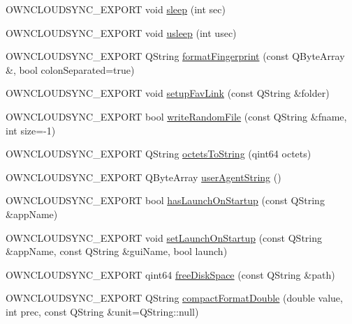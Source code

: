 \begin{DoxyCompactItemize}
\item 
O\+W\+N\+C\+L\+O\+U\+D\+S\+Y\+N\+C\+\_\+\+E\+X\+P\+O\+RT void \hyperlink{namespace_o_c_c_1_1_utility_a2a5852559fec33206166584c0bdc0827}{sleep} (int sec)
\item 
O\+W\+N\+C\+L\+O\+U\+D\+S\+Y\+N\+C\+\_\+\+E\+X\+P\+O\+RT void \hyperlink{namespace_o_c_c_1_1_utility_ac9cc640e21cdc30773dcdf9eaa01904d}{usleep} (int usec)
\item 
O\+W\+N\+C\+L\+O\+U\+D\+S\+Y\+N\+C\+\_\+\+E\+X\+P\+O\+RT Q\+String \hyperlink{namespace_o_c_c_1_1_utility_a2a3ee3aad7e4c551758f0bceb7c76172}{format\+Fingerprint} (const Q\+Byte\+Array \&, bool colon\+Separated=true)
\item 
O\+W\+N\+C\+L\+O\+U\+D\+S\+Y\+N\+C\+\_\+\+E\+X\+P\+O\+RT void \hyperlink{namespace_o_c_c_1_1_utility_adaea063f9fc0245cd9611c76a0ef38e6}{setup\+Fav\+Link} (const Q\+String \&folder)
\item 
O\+W\+N\+C\+L\+O\+U\+D\+S\+Y\+N\+C\+\_\+\+E\+X\+P\+O\+RT bool \hyperlink{namespace_o_c_c_1_1_utility_a7f843bb280e0e8485149094c9ffbee48}{write\+Random\+File} (const Q\+String \&fname, int size=-\/1)
\item 
O\+W\+N\+C\+L\+O\+U\+D\+S\+Y\+N\+C\+\_\+\+E\+X\+P\+O\+RT Q\+String \hyperlink{namespace_o_c_c_1_1_utility_a9b789ccc2cc363c3adcbd7cde466375c}{octets\+To\+String} (qint64 octets)
\item 
O\+W\+N\+C\+L\+O\+U\+D\+S\+Y\+N\+C\+\_\+\+E\+X\+P\+O\+RT Q\+Byte\+Array \hyperlink{namespace_o_c_c_1_1_utility_a4beaff7073bfbd75da5f761b8c02c1ab}{user\+Agent\+String} ()
\item 
O\+W\+N\+C\+L\+O\+U\+D\+S\+Y\+N\+C\+\_\+\+E\+X\+P\+O\+RT bool \hyperlink{namespace_o_c_c_1_1_utility_a4db4f042cee5710dad04f70193992740}{has\+Launch\+On\+Startup} (const Q\+String \&app\+Name)
\item 
O\+W\+N\+C\+L\+O\+U\+D\+S\+Y\+N\+C\+\_\+\+E\+X\+P\+O\+RT void \hyperlink{namespace_o_c_c_1_1_utility_a65ed1f8867bc2161160f62bf07b5fed0}{set\+Launch\+On\+Startup} (const Q\+String \&app\+Name, const Q\+String \&gui\+Name, bool launch)
\item 
O\+W\+N\+C\+L\+O\+U\+D\+S\+Y\+N\+C\+\_\+\+E\+X\+P\+O\+RT qint64 \hyperlink{namespace_o_c_c_1_1_utility_a0b8741e91bdc3b0209d75c3627308b89}{free\+Disk\+Space} (const Q\+String \&path)
\item 
O\+W\+N\+C\+L\+O\+U\+D\+S\+Y\+N\+C\+\_\+\+E\+X\+P\+O\+RT Q\+String \hyperlink{namespace_o_c_c_1_1_utility_a36c3adb4288666fda8760edea6283405}{compact\+Format\+Double} (double value, int prec, const Q\+String \&unit=Q\+String\+::null)

\end{DoxyCompactItemize}
